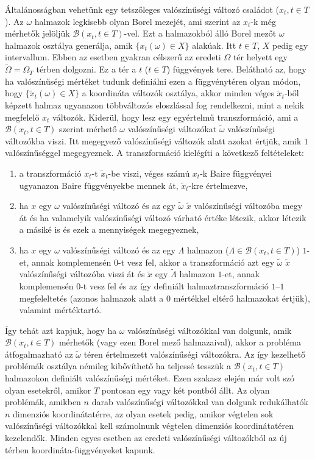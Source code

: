 \documentclass{article}
\begin{document}
Általánosságban vehetünk egy tetszőleges valószínűségi változó családot ($x_t, t \in T$). Az $\omega$ halmazok legkisebb olyan Borel mezejét, ami szerint az $x_t$-k még mérhetők jelöljük $\mathscr{B}(x_t, t \in T)$-vel. Ezt a halmazokból álló Borel mezőt $\omega$ halmazok osztálya generálja, amik $\{x_t(\omega) \in X\}$ alakúak. Itt $t \in T$, $X$ pedig egy intervallum. Ebben az esetben gyakran célszerű az eredeti $\Omega$ tér helyett egy $\tilde{\Omega} = \Omega_T$ térben dolgozni. Ez a tér a $t$ ($t \in T$) függvények tere. Belátható az, hogy ha valószínűségi mértéket tudunk definiálni ezen a függvénytéren olyan módon, hogy $\{\tilde{x}_t(\omega) \in X\}$ a koordináta változók osztálya, akkor minden véges $\tilde{x}_t$-ből képzett halmaz ugyanazon többváltozós eloszlással fog rendelkezni, mint a nekik megfelelő $x_t$ változók. Kiderül, hogy lesz egy egyértelmű transzformáció, ami a $\mathscr{B}(x_t, t \in T)$ szerint mérhető $\omega$ valószínűségi változókat $\tilde{\omega}$ valószínűségi változókba viszi. Itt megegyező valószínűségi változók alatt azokat értjük, amik $1$ valószínűséggel megegyeznek. A transzformáció kielégíti a következő feltételeket:
\begin{enumerate}[label=(\roman*)]
	\item a transzformáció $x_t$-t $\tilde{x}_t$-be viszi, véges számú $x_t$-k Baire függvényei ugyanazon Baire függvényekbe mennek át, $\tilde{x}_t$-kre értelmezve,
	\item ha $x$ egy $\omega$ valószínűségi változó és az egy $\tilde{\omega}$ $\tilde{x}$ valószínűségi változóba megy át és ha valamelyik valószínűségi változó várható értéke létezik, akkor létezik a másiké is és ezek a mennyiségek megegyeznek,
	\item ha $x$ egy $\omega$ valószínűségi változó és az egy $\Lambda$ halmazon ($\Lambda \in \mathscr{B}(x_t, t \in T)$) $1$-et, annak komplemensén $0$-t vesz fel, akkor a transzformáció azt egy $\tilde{\omega}$ $\tilde{x}$ valószínűségi változóba viszi át és $\tilde{x}$ egy $\tilde{\Lambda}$ halmazon $1$-et, annak komplemensén $0$-t vesz fel és az így definiált halmaztranszformáció $1$--$1$ megfeleltetés (azonos halmazok alatt a $0$ mértékkel eltérő halmazokat értjük), valamint mértéktartó. 
\end{enumerate}

Így tehát azt kapjuk, hogy ha $\omega$ valószínűségi változókkal van dolgunk, amik $\mathscr{B}(x_t, t \in T)$ mérhetők (vagy ezen Borel mező halmazaival), akkor a probléma átfogalmazható az $\tilde{\omega}$ téren értelmezett valószínűségi változókra. Az így kezelhető problémák osztálya némileg kibővíthető ha teljessé tesszük a $\mathscr{B}(x_t, t \in T)$ halmazokon definiált valószínűségi mértéket. Ezen szakasz elején már volt szó olyan esetekről, amikor $T$ pontosan egy vagy két pontból állt. Az olyan problémák, amikben $n$ darab valószínűségi változókkal van dolgunk redukálhatók $n$ dimenziós koordinátatérre, az olyan esetek pedig, amikor végtelen sok valószínűségi változókkal kell számolnunk végtelen dimenziós koordinátatéren kezelendők. Minden egyes esetben az eredeti valószínűségi változókból az új térben koordináta-függvényeket kapunk.
\end{document}
